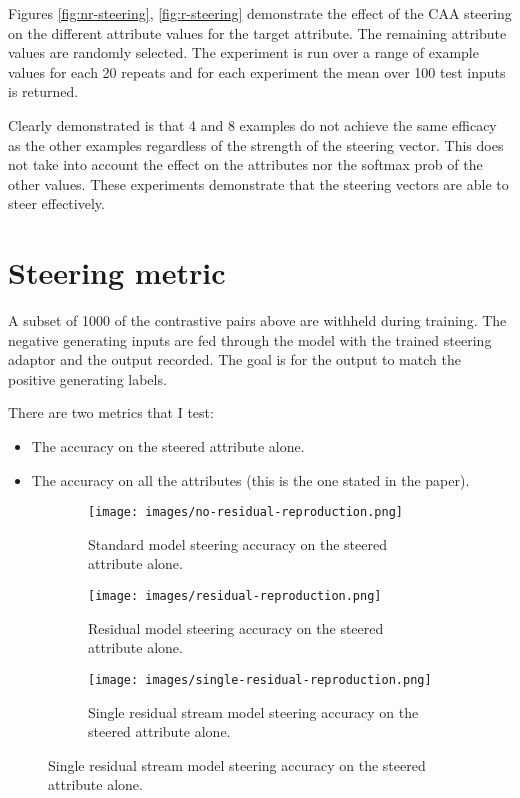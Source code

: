 \documentclass[]{article}
\begin{document}
Figures \ref{fig:nr-steering}, \ref{fig:r-steering} demonstrate the effect of the CAA steering on the different attribute values for the target attribute.
The remaining attribute values are randomly selected.
The experiment is run over a range of example values for each 20 repeats and for each experiment the mean over 100 test inputs is returned.

Clearly demonstrated is that 4 and 8 examples do not achieve the same efficacy as the other examples regardless of the strength of the steering vector.
This does not take into account the effect on the attributes nor the softmax prob of the other values.
These experiments demonstrate that the steering vectors are able to steer effectively.

\section{Steering metric}

A subset of 1000 of the contrastive pairs above are withheld during training.
The negative generating inputs are fed through the model with the trained steering adaptor and the output recorded.
The goal is for the output to match the positive generating labels.

There are two metrics that I test:
\begin{itemize}
    \item The accuracy on the steered attribute alone.
    \item The accuracy on all the attributes (this is the one stated in the paper).
\end{itemize}

\begin{figure}
    \centering
    \begin{subfigure}{0.45\textwidth}
        \texttt{[image: images/no-residual-reproduction.png]}
        \caption{Standard model steering accuracy on the steered attribute alone.}
        \label{fig:nr-reproduction}
    \end{subfigure}
    \hfill
    \begin{subfigure}{0.45\textwidth}
        \texttt{[image: images/residual-reproduction.png]}
        \caption{Residual model steering accuracy on the steered attribute alone.}
        \label{fig:r-reproduction}
    \end{subfigure}
    \begin{subfigure}{0.45\textwidth}
        \texttt{[image: images/single-residual-reproduction.png]}
        \caption{Single residual stream model steering accuracy on the steered attribute alone.}
        \label{fig:sr-reproduction}
    \end{subfigure}
\end{figure}
\end{document}
